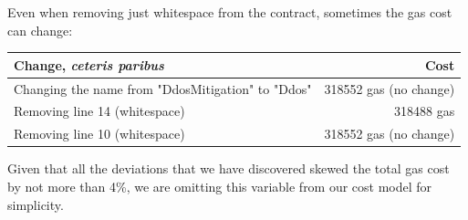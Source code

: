 Even when removing just whitespace from the contract, sometimes the gas cost can change:

\begin{center}
  \begin{tabular}{ l | r }
    \hline
    \textbf{Change, \textit{ceteris paribus}} & \textbf{Cost} \\ \hline
    Changing the name from "DdosMitigation" to "Ddos" & 318552 gas (no change) \\ \hline
    Removing line 14 (whitespace) & 318488 gas \\ \hline
    Removing line 10 (whitespace) & 318552 gas (no change) \\
    \hline
  \end{tabular}
\end{center}

Given that all the deviations that we have discovered skewed the total gas cost by not more than 4\%, we are omitting this variable from our cost model for simplicity.
